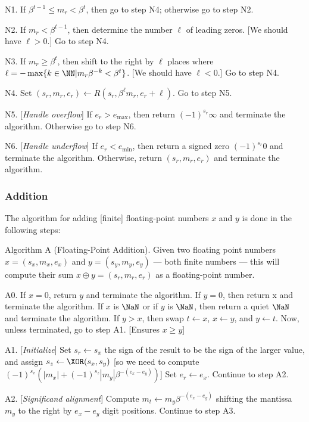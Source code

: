 \algstep N1. If $\beta^{t-1}\leq m_{r}<\beta^{t}$, then go to step N4;
otherwise go to step N2.

\algstep N2. If $m_{r} < \beta^{t-1}$, then determine the number $\ell$
of leading zeros. [We should have $\ell>0$.] Go to step N4.

\algstep N3. If $m_{r} \geq \beta^{t}$, then shift to the right by
$\ell$ places where $\ell = -\max\{k\in\NN | m_{r}\beta^{-k}<\beta^{t}\}$.
[We should have $\ell < 0$.]
Go to step N4.

\algstep N4. Set $(s_{r},m_{r},e_{r})\gets R(s_{r},\beta^{\ell}m_{r},e_{r}+\ell)$.
Go to step N5.

\algstep N5. [{\it Handle overflow\/}] If $e_{r}>e_{\text{max}}$, then
return $(-1)^{s_{r}}\infty$ and terminate the algorithm. Otherwise go to
step N6.

\algstep N6. [{\it Handle underflow\/}] If $e_{r}<e_{\text{min}}$, then
return a signed zero $(-1)^{s_{r}}0$ and terminate the
algorithm. Otherwise, return $(s_{r},m_{r},e_{r})$ and terminate the algorithm.\quad\slug

\subsubsection{Addition}

The algorithm for adding [finite] floating-point numbers $x$ and $y$ is
done in the following steps:

\algbegin Algorithm A (Floating-Point Addition). \label{alg:float-addition}Given two floating
point numbers $x=(s_{x},m_{x},e_{x})$ and $y=(s_{y},m_{y},e_{y})$ ---
both finite numbers --- this
will compute their sum $x\oplus y = (s_{r}, m_{r}, e_{r})$ as a
floating-point number.

\algstep A0.
If $x = 0$, return $y$ and terminate the algorithm.
If $y=0$, then return x and terminate the algorithm.
If $x$ is $\NaN$ or if $y$ is $\NaN$, then return a quiet $\NaN$
and terminate the algorithm.
If $y > x$, then swap $t\gets x$, $x\gets y$, and $y\gets t$.
Now, unless terminated, go to step A1. [Ensures $x\geq y$]

\algstep A1. [{\it Initialize\/}]
Set $s_{r}\gets s_{x}$ the sign of the
result to be the sign of the larger value, and assign $s_{z} \gets \XOR(s_{x},s_{y})$
[so we need to compute $(-1)^{s_{x}}(|m_{x}| + (-1)^{s_{z}}|m_{y}|\beta^{-(e_{x}-e_{y})})$]
Set $e_{r}\gets e_{x}$. Continue to step A2.

\algstep A2. [{\it Significand alignment\/}] Compute $m_{t}\gets m_{y}\beta^{-(e_{x}-e_{y})}$
shifting the mantissa $m_{y}$ to the right by $e_{x}-e_{y}$ digit
positions. Continue to step A3.


